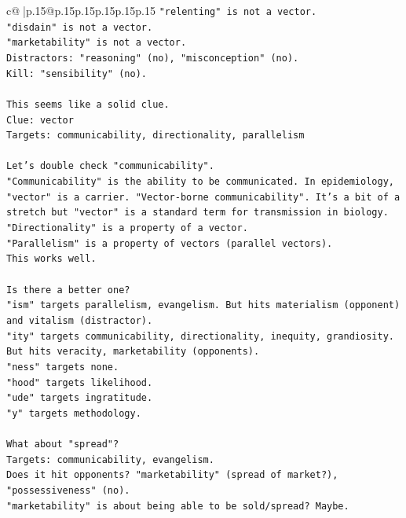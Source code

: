 \documentclass{article}
\begin{document}
{\begin{supertabular}{c@{$\;$}|p{.15\linewidth}@{}p{.15\linewidth}p{.15\linewidth}p{.15\linewidth}p{.15\linewidth}p{.15\linewidth}}
{{{\texttt{"relenting" is not a vector.} \\
\texttt{"disdain" is not a vector.} \\
\texttt{"marketability" is not a vector.} \\
\texttt{Distractors: "reasoning" (no), "misconception" (no).} \\
\texttt{Kill: "sensibility" (no).} \\
\\ 
\texttt{This seems like a solid clue.} \\
\texttt{Clue: vector} \\
\texttt{Targets: communicability, directionality, parallelism} \\
\\ 
\texttt{Let's double check "communicability".} \\
\texttt{"Communicability" is the ability to be communicated. In epidemiology, "vector" is a carrier. "Vector{-}borne communicability". It's a bit of a stretch but "vector" is a standard term for transmission in biology.} \\
\texttt{"Directionality" is a property of a vector.} \\
\texttt{"Parallelism" is a property of vectors (parallel vectors).} \\
\texttt{This works well.} \\
\\ 
\texttt{Is there a better one?} \\
\texttt{"ism" targets parallelism, evangelism. But hits materialism (opponent) and vitalism (distractor).} \\
\texttt{"ity" targets communicability, directionality, inequity, grandiosity. But hits veracity, marketability (opponents).} \\
\texttt{"ness" targets none.} \\
\texttt{"hood" targets likelihood.} \\
\texttt{"ude" targets ingratitude.} \\
\texttt{"y" targets methodology.} \\
\\ 
\texttt{What about "spread"?} \\
\texttt{Targets: communicability, evangelism.} \\
\texttt{Does it hit opponents? "marketability" (spread of market?), "possessiveness" (no).} \\
\texttt{"marketability" is about being able to be sold/spread? Maybe.} \\
}}}
\end{supertabular}}
\end{document}

